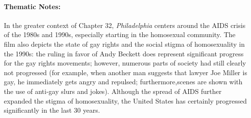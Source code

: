 \documentclass{article}
\begin{document}
\mbox{} \\\textbf{Thematic Notes:} \\~\\
   In the greater context of Chapter 32, \textit{Philadelphia} centers around the AIDS crisis of the 1980s and 1990s, especially starting in the homosexual community. The film also depicts the state of gay rights and the social stigma of homosexuality in the 1990s: the ruling in favor of Andy Beckett does represent significant progress for the gay rights movements; however, numerous parts of society had still clearly not progressed (for example, when another man suggests that lawyer Joe Miller is gay, he immediately gets angry and repulsed; furthermore,scenes are shown with the use of anti-gay slurs and jokes). Although the spread of AIDS further expanded the stigma of homosexuality, the United States has certainly progressed significantly in the last 30 years.

 
\end{document}
